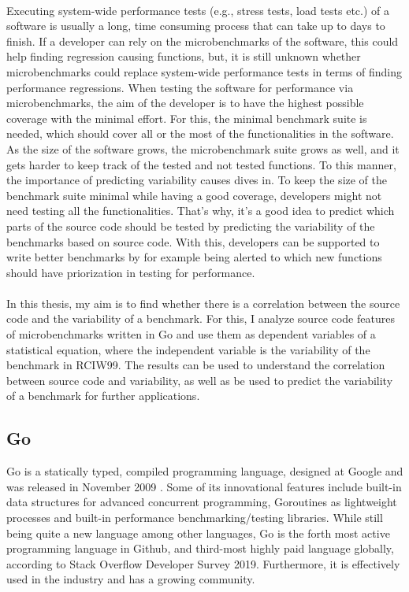 \documentclass{seal_thesis}
\begin{document}
\\
Executing system-wide performance tests (e.g., stress tests, load tests etc.) of a software is usually a long, time consuming process that can take up to days to finish\cite{Laaber:2018:EOS:3196398.3196407}. If a developer can rely on the microbenchmarks of the software, this could help finding regression causing functions, but, it is still unknown whether microbenchmarks could replace system-wide performance tests in terms of finding performance regressions. When testing the software for performance via microbenchmarks, the aim of the developer is to have the highest possible coverage  with the minimal effort. For this, the minimal benchmark suite is needed, which should cover all or the most of the functionalities in the software. As the size of the software grows, the microbenchmark suite grows as well, and it gets harder to keep track of the tested and not tested functions. To this manner, the importance of predicting variability causes dives in. To keep the size of the benchmark suite minimal while having a good coverage, developers might not need testing all the functionalities. That's why, it's a good idea to predict which parts of the source code should be tested by predicting the variability of the benchmarks based on source code. With this, developers can be supported to write better benchmarks by for example being alerted to which new functions should have priorization in testing for performance.\\
\\
In this thesis, my aim is to find whether there is a correlation between the source code and the variability of a benchmark. For this, I analyze source code features of microbenchmarks written in Go and use them as dependent variables of a statistical equation,  where the independent variable is the variability of the benchmark in RCIW99. The results can be used to understand the correlation between source code and variability, as well as be used to predict the variability of a benchmark for further applications.\\

\subsection{Go}

Go is a statically typed, compiled programming language, designed at Google and was released in November 2009 \cite{go}. Some of its innovational features include built-in data structures for advanced concurrent programming, Goroutines as lightweight processes and built-in performance benchmarking/testing libraries. While still being quite a new language among other languages, Go is the forth most active programming language in Github, and third-most highly paid language globally, according to Stack Overflow Developer Survey 2019\cite{stackoverflowdev}. Furthermore, it is effectively used in the industry and has a growing community.\\
\\
\end{document}
